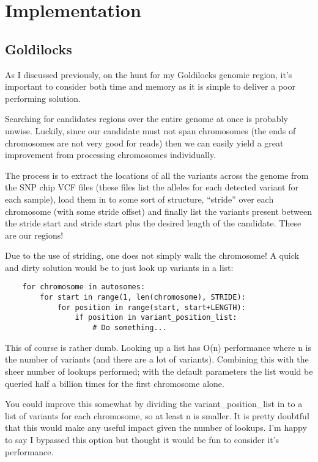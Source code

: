 \section{Implementation}
\subsection{Goldilocks}

As I discussed previously, on the hunt for my Goldilocks genomic region, it’s
important to consider both time and memory as it is simple to deliver a poor
performing solution.

Searching for candidates regions over the entire genome at once is probably
unwise. Luckily, since our candidate must not span chromosomes (the ends of
chromosomes are not very good for reads) then we can easily yield a great
improvement from processing chromosomes individually.

The process is to extract the locations of all the variants across the genome
from the SNP chip VCF files (these files list the alleles for each detected
variant for each sample), load them in to some sort of structure, “stride” over
each chromosome (with some stride offset) and finally list the variants present
between the stride start and stride start plus the desired length of the
candidate. These are our regions!

Due to the use of striding, one does not simply walk the chromosome! A quick
and dirty solution would be to just look up variants in a list:

\begin{verbatim}
    for chromosome in autosomes:
        for start in range(1, len(chromosome), STRIDE):
            for position in range(start, start+LENGTH):
                if position in variant_position_list:
                    # Do something...
\end{verbatim}

This of course is rather dumb. Looking up a list has O(n) performance where n
is the number of variants (and there are a lot of variants). Combining this
with the sheer number of lookups performed; with the default parameters the
list would be queried half a billion times for the first chromosome alone.

You could improve this somewhat by dividing the variant\_position\_list in to a
list of variants for each chromosome, so at least n is smaller. It is pretty
doubtful that this would make any useful impact given the number of lookups.
I’m happy to say I bypassed this option but thought it would be fun to consider
it’s performance.

